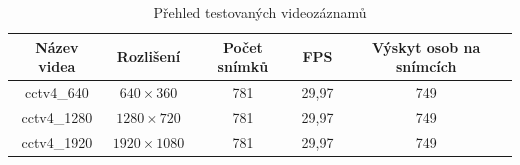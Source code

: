 \begin{table}[H]
\centering
\caption{Přehled testovaných videozáznamů}
\begin{tabular} { |c|c|c|c|c| }
\hline
{Název videa}   & {Rozlišení} 	     &  {Počet snímků} & {FPS} & {Výskyt osob na snímcích} \\ \hline
cctv4\_640 	 &  $640\times360$	     &      781	   & 29,97 & 	      749			    \\ \hline
cctv4\_1280	 & $1280\times720$       &      781	   & 29,97 & 	      749			    \\ \hline
cctv4\_1920 	 & $1920\times1080$	     &      781	   & 29,97 & 	      749			    \\ \hline
\end{tabular}
\label{videosTab}
\end{table}

